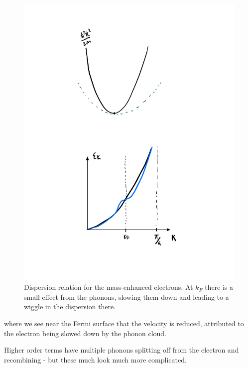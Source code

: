 \begin{figure}[htbp]
    \centering
    \includegraphics[scale=0.6]{Images/fig-enhancedmassdispersion.pdf}
    \caption{Dispersion relation for the mass-enhanced electrons. At $k_F$ there is a small effect from the phonons, slowing them down and leading to a wiggle in the dispersion there.}
    \label{fig-enhancedmassdispersion}
\end{figure}

where we see near the Fermi surface that the velocity is reduced, attributed to the electron being slowed down by the phonon cloud.

Higher order terms have multiple phonons splitting off from the electron and recombining - but these much look much more complicated.